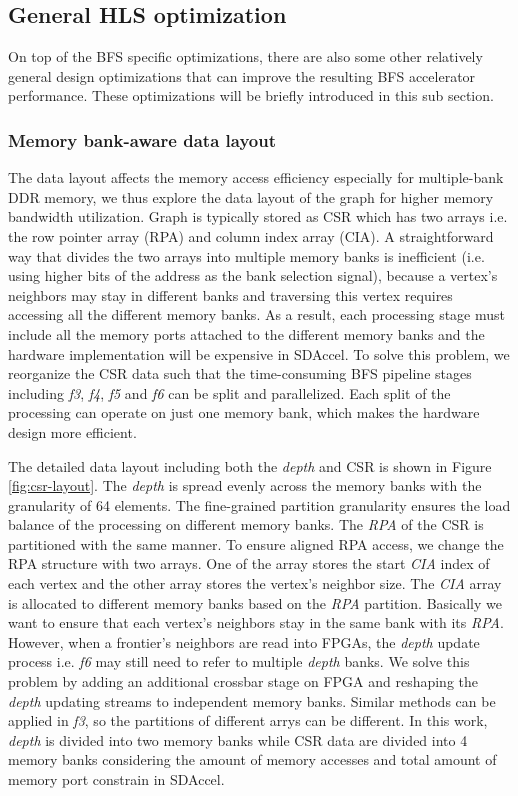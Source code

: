 \subsection{General HLS optimization}
On top of the BFS specific optimizations, there are also 
some other relatively general design optimizations that can improve the 
resulting BFS accelerator performance. These optimizations will be briefly 
introduced in this sub section.

\subsubsection{Memory bank-aware data layout}
The data layout affects the memory access efficiency 
especially for multiple-bank DDR memory, we thus explore the 
data layout of the graph for higher memory bandwidth utilization. 
Graph is typically stored as CSR which has two arrays i.e. the row pointer 
array (RPA) and column index array (CIA). A straightforward way that 
divides the two arrays into multiple memory banks is inefficient (i.e. using higher bits of the 
address as the bank selection signal), because a vertex's neighbors may stay in different 
banks and traversing this vertex requires accessing all the different memory banks. 
As a result, each processing stage must include all the memory ports attached 
to the different memory banks and the hardware implementation will be expensive 
in SDAccel. To solve this problem, we reorganize the CSR data such that the 
time-consuming BFS pipeline stages including \textit{f3}, \textit{f4}, \textit{f5} and \textit{f6} 
can be split and parallelized. Each split of the processing can operate 
on just one memory bank, which makes the hardware design more efficient.

The detailed data layout including both the \textit{depth} and 
CSR is shown in Figure \ref{fig:csr-layout}.
The \textit{depth} is spread evenly across the memory banks 
with the granularity of 64 elements. The fine-grained partition 
granularity ensures the load balance of the processing on 
different memory banks. The \textit{RPA} of the CSR is partitioned 
with the same manner. To ensure aligned RPA access, we change the 
RPA structure with two arrays. One of the array stores the start \textit{CIA} 
index of each vertex and the other array stores the vertex's neighbor size.
The \textit{CIA} array is allocated to different memory banks 
based on the \textit{RPA} partition. Basically we want to ensure that each vertex's 
neighbors stay in the same bank with its \textit{RPA}. However, when a frontier's neighbors 
are read into FPGAs, the \textit{depth} update process i.e. \textit{f6} may still need to refer to multiple 
\textit{depth} banks. We solve this problem by adding an additional crossbar stage on FPGA and 
reshaping the \textit{depth} updating streams to independent memory banks. Similar methods 
can be applied in \textit{f3}, so the partitions of different arrys can be different.
In this work, \textit{depth} is divided into two memory banks 
while CSR data are divided into 4 memory banks considering the 
amount of memory accesses and total amount of memory port constrain in SDAccel.

